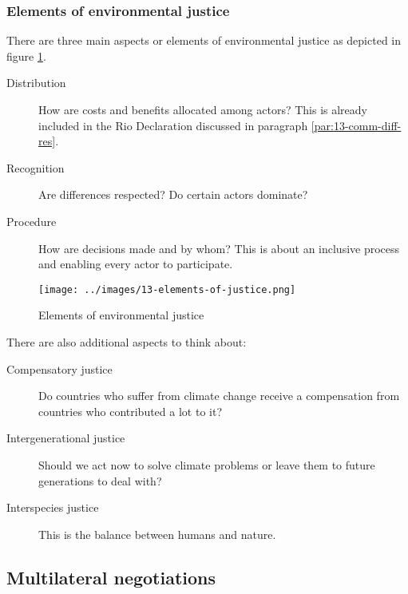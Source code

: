 \documentclass[../summary.tex]{subfiles}
\begin{document}
		\subsubsection{Elements of environmental justice}
			There are three main aspects or elements of environmental justice as depicted in figure \ref{fig:13-elements-of-justice}.
			\begin{description}
				\item[Distribution] How are costs and benefits allocated among actors? This is already included in the Rio Declaration discussed in paragraph \ref{par:13-comm-diff-res}.
				\item[Recognition] Are differences respected? Do certain actors dominate?
				\item[Procedure] How are decisions made and by whom? This is about an inclusive process and enabling every actor to participate.
			\end{description}
			\begin{figure}[h]
				\centering
				\texttt{[image: ../images/13-elements-of-justice.png]}
				\caption{Elements of environmental justice}
				\label{fig:13-elements-of-justice}
			\end{figure}
			There are also additional aspects to think about:
			\begin{description}
				\item[Compensatory justice] Do countries who suffer from climate change receive a compensation from countries who contributed a lot to it?
				\item[Intergenerational justice] Should we act now to solve climate problems or leave them to future generations to deal with?
				\item[Interspecies justice] This is the balance between humans and nature. 
			\end{description}
			
			
	\subsection{Multilateral negotiations}
\end{document}
